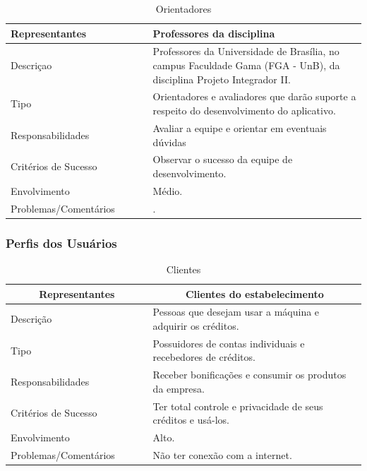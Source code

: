 \begin{apendicesenv}
\begin{table}[htp]
    \centering
    \caption{Orientadores}
    \label{my-label}
    \begin{tabular}{|p{0.40\linewidth}|p{0.60\linewidth}|}
        \hline
        Representantes    & Professores da disciplina \\ \hline
        Descriçao    & Professores da Universidade de Brasília, no campus Faculdade Gama (FGA - UnB), da disciplina Projeto Integrador II. \\ \hline
        Tipo    & Orientadores e avaliadores que darão suporte a respeito do desenvolvimento do aplicativo. \\ \hline
        Responsabilidades    & Avaliar a equipe e orientar em eventuais dúvidas \\ \hline
        Critérios de Sucesso    & Observar o sucesso da equipe de desenvolvimento. \\ \hline
        Envolvimento    & Médio. \\ \hline
        Problemas/Comentários    & . \\ \hline
    \end{tabular}
\end{table}

\subsubsection{Perfis dos Usuários}


\begin{table}[htp]
    \centering
    \caption{Clientes}
    \label{my-label}
    \begin{tabular}{|p{0.40\linewidth}|p{0.60\linewidth}|}
        \hline
        \multicolumn{1}{|c|}{\textbf{Representantes}} & \multicolumn{1}{c|}{\textbf{Clientes do estabelecimento}} \\ \hline
        Descrição    & Pessoas que desejam usar a máquina e adquirir os créditos. \\ \hline
        Tipo    & Possuidores de contas individuais e recebedores de créditos. \\ \hline
        Responsabilidades    & Receber bonificações e consumir os produtos da empresa. \\ \hline
        Critérios de Sucesso    & Ter total controle e privacidade de seus créditos e usá-los. \\ \hline
        Envolvimento    & Alto. \\ \hline
        Problemas/Comentários    & Não ter conexão com a internet. \\ \hline
    \end{tabular}
\end{table}


\end{apendicesenv}

